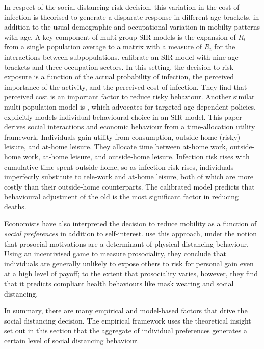 \documentclass[12pt,a4]{article}
\begin{document}
In respect of the social distancing risk decision, this variation in the cost of infection is theorised to generate a disparate response in different age brackets, in addition to the usual demographic and occupational variation in mobilty patterns with age. A key component of multi-group SIR models is the expansion of \(R_t\) from a single population average to a matrix with a measure of \(R_t\) for the interactions between subpopulations. \textcite{faveroRestartingEconomySaving2020} calibrate an SIR model with nine age brackets and three occupation sectors. In this setting, the decision to risk exposure is a function of the actual probability of infection, the perceived importance of the activity, and the perceived cost of infection. They find that perceived cost is an important factor to reduce risky behaviour. Another similar multi-population model is \textcite{acemogluOptimalTargetedLockdowns2020}, which advocates for targeted age-dependent policies. \textcite{brotherhoodEconomicModelCOVID192020} explicitly models individual behavioural choice in an SIR model. This paper derives social interactions and economic behaviour from a time-allocation utility framework. Individuals gain utility from consumption, outside-home (risky) leisure, and at-home leisure. They allocate time between at-home work, outside-home work, at-home leisure, and outside-home leisure. Infection risk rises with cumulative time spent outside home, so as infection risk rises, individuals imperfectly substitute to tele-work and at-home leisure, both of which are more costly than their outside-home counterparts. The calibrated model predicts that behavioural adjustment of the old is the most significant factor in reducing deaths.

Economists have also interpreted the decision to reduce mobility as a function of \textit{social preferences} \parencite{fehrTheoryFairnessCompetition1999} in addition to self-interest. \textcite{campos-mercadeProsocialityPredictsHealth2021} use this approach, under the notion that prosocial motivations are a determinant of physical distancing behaviour. Using an incentivised game to measure prosociality, they conclude that individuals are generally unlikely to expose others to risk for personal gain even at a high level of payoff; to the extent that prosociality varies, however, they find that it predicts compliant health behaviours like mask wearing and social distancing. 

In summary, there are many empirical and model-based factors that drive the social distancing decision. The empirical framework uses the theoretical insight set out in this section that the aggregate of individual preferences generates a certain level of social distancing behaviour. 
\end{document}

